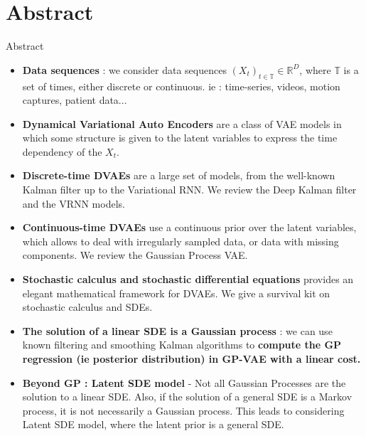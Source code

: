 \section{Abstract}\label{Abstract}

\begin{frame}{Abstract}
    \begin{itemize}
        \item <1-> \textbf{Data sequences} : we consider data sequences $(X_t)_{t \in \mathbb{T}} \in \mathbb{R}^D$, where $\mathbb{T}$ is a set of times, either discrete or continuous. ie : time-series, videos, motion captures, patient data...
        \item <2-> \textbf{Dynamical Variational Auto Encoders} are a class of VAE models in which some structure is given to the latent variables to express the time dependency of the $X_t$.
        \item <3-> \textbf{Discrete-time DVAEs} are a large set of models, from the well-known Kalman filter up to the Variational RNN. We review the Deep Kalman filter and the VRNN models.
        \item <4-> \textbf{Continuous-time DVAEs} use a continuous prior over the latent variables, which allows to deal with irregularly sampled data, or data with missing components. We review the Gaussian Process VAE.
        \item <5-> \textbf{Stochastic calculus and stochastic differential equations} provides an elegant mathematical framework for DVAEs. We give a survival kit on stochastic calculus and SDEs.
        \item <6-> \textbf{The solution of a linear SDE is a Gaussian process} : we can use known filtering and smoothing Kalman algorithms to \textbf{compute the GP regression (ie posterior distribution) in GP-VAE with a linear cost.}
        \item <7-> \textbf{Beyond GP : Latent SDE model} - Not all Gaussian Processes are the solution to a linear SDE. Also, if the solution of a general SDE is a Markov process, it is not necessarily a Gaussian process. This leads to considering Latent SDE model, where the latent prior is a general SDE.
    \end{itemize}
\end{frame}